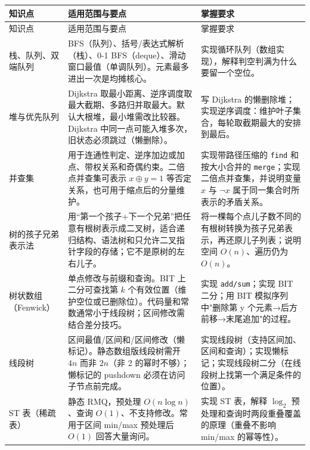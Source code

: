 \documentclass[a4paper,11pt]{article}
\newcommand{\code}[1]{\texttt{#1}}
\begin{document}
\begin{longtable}{L{2.4cm} L{7.5cm} L{6.8cm}}
\toprule
知识点 & 适用范围与要点 & 掌握要求 \\
\midrule
\endfirsthead
\toprule
知识点 & 适用范围与要点 & 掌握要求 \\
\midrule
\endhead
\endfoot
\bottomrule
\endlastfoot

栈、队列、双端队列
& BFS（队列）、括号/表达式解析（栈）、0-1 BFS（deque）、滑动窗口最值（单调队列）。元素最多进出一次是均摊核心。
& 实现循环队列（数组实现），解释判空判满为什么要留一个空位。\\[2mm]

堆与优先队列
& Dijkstra 取最小距离、逆序调度取最大截期、多路归并取最大。默认大根堆，最小堆需改比较器。Dijkstra 中同一点可能入堆多次，旧状态必须跳过（懒删除）。
& 写 Dijkstra 的懒删除堆；实现逆序调度：维护叶子集合，每轮取截期最大的安排到最后。\\[2mm]

并查集
& 用于连通性判定、逆序加边或加点、带权关系和奇偶约束。二倍点并查集可表示 $x\oplus y=1$ 等否定关系，也可用于缩点后的分量维护。
& 实现带路径压缩的 \code{find} 和按大小合并的 \code{merge}；实现二倍点并查集，并说明变量 $x$ 与 $\lnot x$ 属于同一集合时所表示的矛盾关系。\\[2mm]

树的孩子兄弟表示法
& 用“第一个孩子+下一个兄弟”把任意有根树表示成二叉树，适合递归结构、语法树和只允许二叉指针字段的存储；它不是原树的左右儿子。
& 将一棵每个点儿子数不同的有根树转换为孩子兄弟表示，再还原儿子列表；说明空间 $O(n)$、遍历仍为 $O(n)$。\\[2mm]

树状数组（Fenwick）
& 单点修改与前缀和查询。BIT 上二分可查找第 $k$ 个有效位置（维护空位或已删除位）。代码量和常数通常小于线段树；区间修改需结合差分技巧。
& 实现 \code{add/sum}；实现 BIT 二分；用 BIT 模拟序列中"删除第 y 个元素→后方前移→末尾追加"的过程。\\[2mm]

线段树
& 区间最值/区间和/区间修改（懒标记）。静态数组版线段树需开 $4n$ 而非 $2n$（非 2 的幂时不够）；懒标记的 pushdown 必须在访问子节点前完成。
& 实现线段树（支持区间加、区间和查询）；实现懒标记；实现线段树二分（在线段树上找第一个满足条件的位置）。\\[2mm]

ST 表（稀疏表）
& 静态 RMQ，预处理 $O(n\log n)$、查询 $O(1)$、不支持修改。常用于区间 min/max 预处理后 $O(1)$ 回答大量询问。
& 实现 ST 表，解释 $\log_2$ 预处理和查询时两段重叠覆盖的原理（重叠不影响 min/max 的幂等性）。\\[2mm]


\end{longtable}
\end{document}
